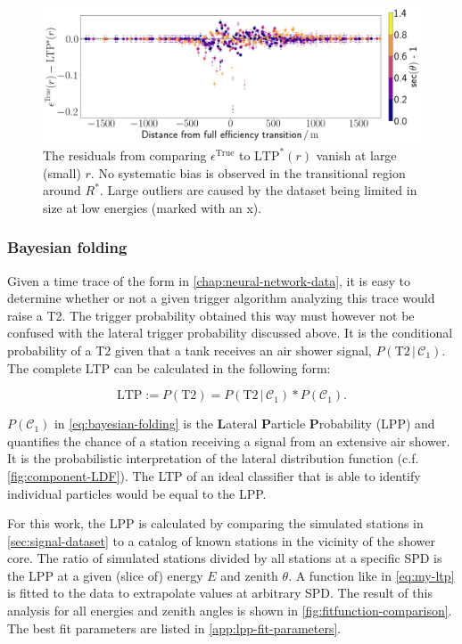 \begin{figure}
	\centering
	\includegraphics[width=1\textwidth]{./plots/LTP_bias_check.png}
	\caption{The residuals from comparing $\epsilon^\text{True}$ to $\text{LTP}^*(r)$ vanish at large (small) $r$. No systematic bias is observed in the 
	transitional region around $R^*$. Large outliers are caused by the dataset being limited in size at low energies (marked with an x).}
	\label{fig:fitfunction-comparison}
\end{figure}

\subsubsection{Bayesian folding}
\label{sssec:bayesian-folding}

Given a time trace of the form in \autoref{chap:neural-network-data}, it is easy to determine whether or not a given trigger algorithm analyzing this trace would
raise a T2. The trigger probability obtained this way must however not be confused with the lateral trigger probability discussed above. It is the conditional 
probability of a T2 given that a tank receives an air shower signal, $P(\text{T2}\,|\,\mathcal{C}_1)$. The complete LTP can be calculated in the following form:

\begin{equation}
	\label{eq:bayesian-folding}
	\text{LTP} := P(\text{T2}) = P(\text{T2}\,|\,\mathcal{C}_1) * P(\mathcal{C}_1).
\end{equation}

$P(\mathcal{C}_1)$ in \autoref{eq:bayesian-folding} is the \textbf{L}ateral \textbf{P}article \textbf{P}robability (LPP) and quantifies the chance of a station 
receiving a signal from an extensive air shower. It is the probabilistic interpretation of the lateral distribution function (c.f. \autoref{fig:component-LDF}). 
The LTP of an ideal classifier that is able to identify individual particles would be equal to the LPP.

For this work, the LPP is calculated by comparing the simulated stations in \autoref{sec:signal-dataset} to a catalog of known stations in the vicinity of the 
shower core. The ratio of simulated stations divided by all stations at a specific SPD is the LPP at a given (slice of) energy $E$ and zenith $\theta$. A 
function like in \autoref{eq:my-ltp} is fitted to the data to extrapolate values at arbitrary SPD. The result of this analysis for all energies and zenith angles
is shown in \autoref{fig:fitfunction-comparison}. The best fit parameters are listed in \autoref{app:lpp-fit-parameters}.


